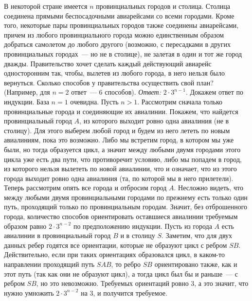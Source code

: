\problem
В некоторой стране имеется $n$ провинциальных городов и столица.
Столица соединена прямыми беспосадочными авиарейсами со всеми городами.
Кроме того, некоторые пары провинциальных городов также соединены авиарейсами,
причем из любого провинциального города можно единственным образом добраться
самолетом до любого другого
(возможно, с пересадками в других провинциальных городах~--- но не в столице),
не залетая в один и тот же город дважды.
Правительство хочет сделать каждый действующий авиарейс односторонним
так, чтобы, вылетев из любого города, в него нельзя было вернуться.
Сколько способов у правительства осуществить свой план?
(Например, для $n = 2$ ответ~--- $6$ способов).
\solution
\emph{Ответ:} $2 \cdot 3^{n-1}$.
Докажем ответ по индукции.
База $n = 1$ очевидна.
Пусть $n > 1$.
Рассмотрим сначала только провинциальные города и соединяющие их авиалинии.
Покажем, что найдется провинциальный город $A$, из которого выходит ровно одна
авиалиния (не в столицу).
Для этого выберем любой город и будем из него лететь по новым авиалиниям, пока
это возможно.
Либо мы встретим город, в котором мы уже были, но тогда образуется цикл, а
значит между любыми двумя городами этого цикла уже есть два пути, что
противоречит условию, либо мы попадем в город, из которого нельзя вылететь по
новой авиалинии, что и означает, что из этого города выходит ровно одна
авиалиния (та, по которой мы в него прилетели).
Теперь рассмотрим опять все города и отбросим город $A$.
Несложно видеть, что между любыми двумя провинциальными городами по прежнему
есть только один путь, проходящий только по провинциальным городам.
Значит, без отброшенного города, количество способов ориентировать оставшиеся
авиалинии требуемым образом равно $2 \cdot 3^{n-2}$ по предположению индукции.
Пусть из города $A$ есть авиалинии в провинциальный город $B$ и в столицу $S$.
Заметим, что для двух данных ребер годятся все ориентации, которые не образуют
цикл с ребром $SB$.
Действительно, если при таких ориентациях образовался цикл, в каком-то
направлении проходящий путь $SAB$, то ребро $SB$ ориентировано также, как и
этот путь (так как они не образуют цикл), а тогда цикл был бы и раньше~---
с ребром $SB$, но это невозможно.
Требуемых ориентаций ровно 3, а это значит, что нужно умножить
$2 \cdot 3^{n-2}$ на 3, и получится требуемое. 
\endproblem
